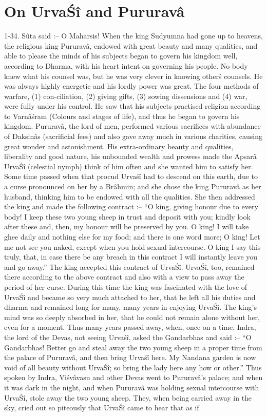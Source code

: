 \chapter{On Urva\'S\^i and Pururav\^a}

1-34. S\^uta said :-- O Maharsis! When the king Sudyumna had gone up to heavens, the religious king Pururav\^a, endowed with great beauty and many qualities, and able to please the minds of his subjects began to govern his kingdom well, according to Dharma, with his heart intent on governing his people. No body knew what his counsel was, but he was very clever in knowing other\'s counsels. He was always highly energetic and his lordly power was great. The four methods of warfare, (1) con-ciliation, (2) giving gifts, (3) sowing dissensions and (4) war, were fully under his control. He saw that his subjects practised religion according to Varn\^a\'sram (Colours and stages of life), and thus he began to govern his kingdom. Pururav\^a, the lord of men, performed various sacrifices with abundance of Daksin\^as (sacrificial fees) and also gave away much in various charities, causing great wonder and astonishment. His extra-ordinary beauty and qualities, liberality and good nature, his unbounded wealth and prowess made the Apsar\^a Urva\'S\^i (celestial nymph) think of him often and she wanted him to satisfy her. Some time passed when that procud Urva\'s\^i had to descend on this earth, due to a curse pronounced on her by a Br\^ahmin; and she chose the king Pururav\^a as her husband, thinking him to be endowed with all the qualities. She then addressed the king and made the following contract :-- ``O king, giving honour due to every body! I keep these two young sheep in trust and deposit with you; kindly look after these and, then, my honour will be preserved by you. O king! I will take ghee daily and nothing else for my food; and there is one word more; O king! Let me not see you naked, except when you hold sexual intercourse. O king I say this truly, that, in case there be any breach in this contract I will instantly leave you and go away.'' The king accepted this contract of Urva\'S\^i. Urva\'S\^i, too, remained there according to the above contract and also with a view to pass away the period of her curse. During this time the king was fascinated with the love of Urva\'S\^i and became so very much attached to her, that he left all his duties and dharma and remained long for many, many years in enjoying Urva\'S\^i. The king's mind was so deeply absorbed in her, that he could not remain alone without her, even for a moment. Thus many years passed away, when, once on a time, Indra, the lord of the Devas, not seeing Urva\'s\^i, asked the Gandarbhas and said :-- ``O Gandarbhas! Better go and steal away the two young sheep in a proper time from the palace of Pururav\^a, and then bring Urva\'s\^i here. My Nandana garden is now void of all beauty without Urva\'S\^i; so bring the lady here any how or other.'' Thus spoken by Indra, Vi\'sv\^avasu and other Devas went to Pururav\^a's palace; and when it was dark in the night, and when Pururav\^a was holding sexual intercourse with Urva\'S\^i, stole away the two young sheep. They, when being carried away in the sky, cried out so piteously that Urva\'S\^i came to hear that as if 